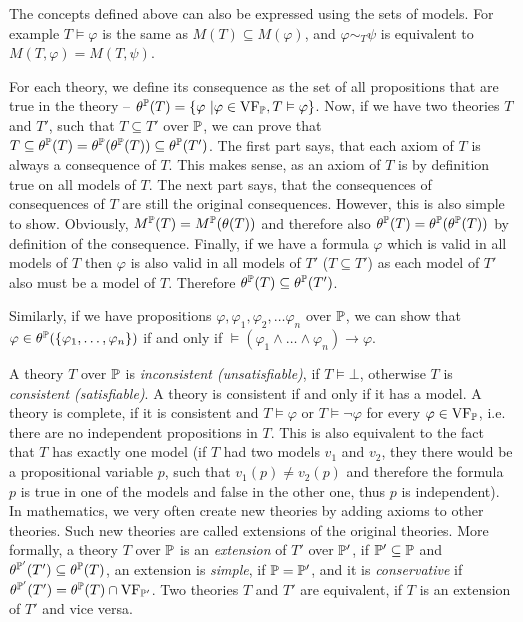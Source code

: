 The concepts defined above can also be expressed using the sets of models. For example $T \vDash \varphi$ is the same as $M(T) \subseteq M(\varphi)$, and $\varphi \sim_T \psi$ is equivalent to $M(T, \varphi) = M(T, \psi)$.

For each theory, we define its consequence as the set of all propositions that are true in the theory -- $\theta^\mathbb{P}(T) = \{\varphi\ | \varphi \in \operatorname{VF}_\mathbb{P}, T \vDash \varphi \}$. Now, if we have two theories $T$ and $T'$, such that $T \subseteq T'$ over $\mathbb{P}$, we can prove that $T \subseteq \theta^\mathbb{P}(T) = \theta^\mathbb{P}(\theta^\mathbb{P}(T)) \subseteq \theta^\mathbb{P}(T')$. The first part says, that each axiom of $T$ is always a consequence of $T$. This makes sense, as an axiom of $T$ is by definition true on all models of $T$. The next part says, that the consequences of consequences of $T$ are still the original consequences. However, this is also simple to show. Obviously, $M^\mathbb{P}(T) = M^\mathbb{P}(\theta(T))$ and therefore also $\theta^\mathbb{P}(T) = \theta^\mathbb{P}(\theta^\mathbb{P}(T))$ by definition of the consequence. Finally, if we have a formula $\varphi$ which is valid in all models of $T$ then $\varphi$ is also valid in all models of $T'$ ($T \subseteq T'$) as each model of $T'$ also must be a model of $T$. Therefore $\theta^\mathbb{P}(T) \subseteq \theta^\mathbb{P}(T')$.

Similarly, if we have propositions $\varphi, \varphi_1, \varphi_2, \dots \varphi_n$ over $\mathbb{P}$, we can show that $\varphi \in \theta^\mathbb{P}(\{\varphi_1, \dots, \varphi_n\})$ if and only if $\vDash (\varphi_1 \land \dots \land \varphi_n) \to \varphi$.

A theory $T$ over $\mathbb{P}$ is \emph{inconsistent (unsatisfiable)}, if $T \vDash \bot$, otherwise $T$ is \emph{consistent (satisfiable)}. A theory is consistent if and only if it has a model. A theory is complete, if it is consistent and $T\vDash \varphi$ or $T \vDash \neg \varphi$ for every $\varphi \in \operatorname{VF}_\mathbb{P}$, i.e. there are no independent propositions in $T$. This is also equivalent to the fact that $T$ has exactly one model (if $T$ had two models $v_1$ and $v_2$, they there would be a propositional variable $p$, such that $v_1(p) \neq v_2(p)$ and therefore the formula $p$ is true in one of the models and false in the other one, thus $p$ is independent). In mathematics, we very often create new theories by adding axioms to other theories. Such new theories are called extensions of the original theories. More formally, a theory $T$ over $\mathbb{P}$ is an \emph{extension} of $T'$ over $\mathbb{P}'$, if $\mathbb{P}' \subseteq \mathbb{P}$ and $\theta^{\mathbb{P}'}(T') \subseteq \theta^\mathbb{P}(T)$, an extension is \emph{simple}, if $\mathbb{P} = \mathbb{P}'$, and it is \emph{conservative} if $\theta^{\mathbb{P}'}(T') = \theta^\mathbb{P}(T) \cap \operatorname{VF}_{\mathbb{P}'}$. Two theories $T$ and $T'$ are equivalent, if $T$ is an extension of $T'$ and vice versa.

